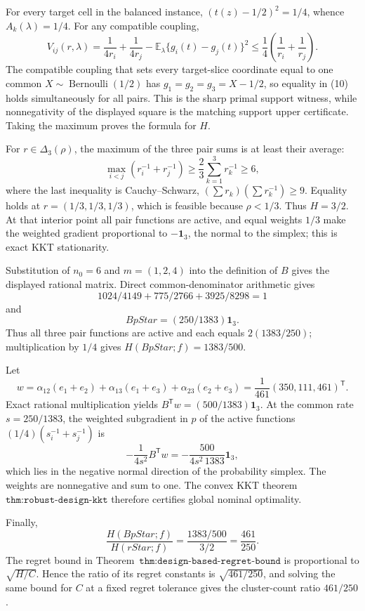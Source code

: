 For every target cell in the balanced instance, \((t(z)-1/2)^2=1/4\), whence \(A_k(\lambda)=1/4\). For any compatible coupling,
\[
V_{ij}(r,\lambda)=\frac1{4r_i}+\frac1{4r_j}-\mathbb E_\lambda\{g_i(t)-g_j(t)\}^2
\le\frac14\left(\frac1{r_i}+\frac1{r_j}\right).
\tag{10}
\]
The compatible coupling that sets every target-slice coordinate equal to one common \(X\sim\operatorname{Bernoulli}(1/2)\) has \(g_1=g_2=g_3=X-1/2\), so equality in (10) holds simultaneously for all pairs. This is the sharp primal support witness, while nonnegativity of the displayed square is the matching support upper certificate. Taking the maximum proves the formula for \(H\).

For \(r\in\Delta_3(\rho)\), the maximum of the three pair sums is at least their average:
\[
\max_{i<j}(r_i^{-1}+r_j^{-1})\ge\frac23\sum_{k=1}^3r_k^{-1}\ge6,
\]
where the last inequality is Cauchy--Schwarz, \((\sum r_k)(\sum r_k^{-1})\ge9\). Equality holds at \(r=(1/3,1/3,1/3)\), which is feasible because \(\rho<1/3\). Thus \(H=3/2\). At that interior point all pair functions are active, and equal weights \(1/3\) make the weighted gradient proportional to \(-\mathbf1_3\), the normal to the simplex; this is exact KKT stationarity.

Substitution of \(n_0=6\) and \(m=(1,2,4)\) into the definition of \(B\) gives the displayed rational matrix. Direct common-denominator arithmetic gives
\[
1024/4149+775/2766+3925/8298=1
\]
and
\[
BpStar=(250/1383)\mathbf1_3.
\]
Thus all three pair functions are active and each equals \(2(1383/250)\); multiplication by \(1/4\) gives \(H(BpStar;f)=1383/500\).

Let
\[
w=\alpha_{12}(e_1+e_2)+\alpha_{13}(e_1+e_3)+\alpha_{23}(e_2+e_3)
=\frac1{461}(350,111,461)^{\mathsf T}.
\]
Exact rational multiplication yields \(B^{\mathsf T}w=(500/1383)\mathbf1_3\). At the common rate \(s=250/1383\), the weighted subgradient in \(p\) of the active functions \((1/4)(s_i^{-1}+s_j^{-1})\) is
\[
-\frac1{4s^2}B^{\mathsf T}w=-\frac{500}{4s^2\,1383}\mathbf1_3,
\]
which lies in the negative normal direction of the probability simplex. The weights are nonnegative and sum to one. The convex KKT theorem \(\texttt{thm:robust-design-kkt}\) therefore certifies global nominal optimality.

Finally,
\[
\frac{H(BpStar;f)}{H(rStar;f)}=\frac{1383/500}{3/2}=\frac{461}{250}.
\]
The regret bound in Theorem~\(\texttt{thm:design-based-regret-bound}\) is proportional to \(\sqrt{H/C}\). Hence the ratio of its regret constants is \(\sqrt{461/250}\), and solving the same bound for \(C\) at a fixed regret tolerance gives the cluster-count ratio \(461/250\).
